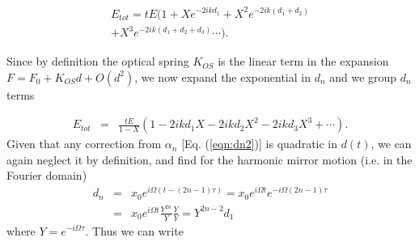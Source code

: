 



\begin{align}
E_{tot}=tE(1+Xe^{-2ikd_1} +X^2e^{-2ik(d_1+d_2)}\nonumber\\
+X^3e^{-2ik(d_1+d_2+d_3)} \cdots ).\nonumber
\end{align}

Since by definition the optical spring $K_{OS}$ is the linear term in the expansion $F=F_0+ K_{OS} d + O(d^2)$, we now expand the exponential in $d_n$ and we group $d_n$ terms %

\begin{align}
E_{tot}&=&\frac{tE}{1-X}(1-2ikd_1 X-2ikd_2 X^2-2ikd_3 X^3+\cdots). \nonumber
\end{align}
Given that any correction from $\alpha_n$ [Eq. (\ref{eqn:dn2})] is quadratic in $d(t)$, we can again neglect it by definition, and find for the harmonic mirror motion (i.e. in the Fourier domain)
\begin{align}
d_n&=&x_0e^{i\Omega(t-(2n-1)\tau)}=x_0e^{i\Omega t}e^{-i\Omega(2n-1)\tau}\nonumber\\
&=&x_0e^{i\Omega t} \frac{Y^{2n}}{Y}\frac{Y}{Y}=Y^{2n-2}d_1
\end{align}
where $Y=e^{-i\Omega\tau}$. Thus we can write

